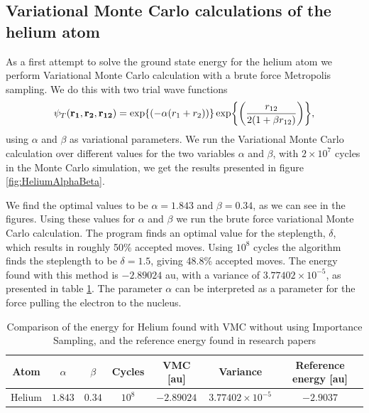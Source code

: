 
	\subsection{Variational Monte Carlo calculations of the helium atom}
		As a first attempt to solve the ground state energy for the helium
		atom we perform Variational Monte Carlo calculation with a brute force
		Metropolis sampling. We do this with two trial wave functions
		\[
		\psi_{T}({\bf r_{1}},{\bf r_{2}},{\bf r_{12}})=\exp{\left(-\alpha(r_{1}+r_{2})\right)}\exp{\left(\frac{r_{12}}{2(1+\beta r_{12})}\right)},
		\]
		using $\alpha$ and $\beta$ as variational parameters. 
		We run the Variational Monte Carlo calculation over
		different values for the two variables $\alpha$ and $\beta$, 
		with $2\times10^{7}$ cycles in the Monte Carlo simulation, we get the results
		presented in figure \ref{fig:HeliumAlphaBeta}.
		
		We find the optimal values to be  $\alpha=1.843$ and $\beta=0.34$, as we can see in the figures.
		Using these values for $\alpha$ and $\beta$ we run the brute force variational Monte Carlo calculation. The program finds an optimal value for the steplength, $\delta$, which results in roughly 50\% accepted moves. Using $10^{8}$ cycles the algorithm finds the steplength to be $\delta = 1.5$, giving 48.8\% accepted moves. The energy found with this method is $-2.89024$ au, with a variance of $3.77402\times10^{-5}$, as presented in table \ref{tab:Helium_no_IS}.
		The parameter $\alpha$ can be interpreted as a parameter for the
		force pulling the electron to the nucleus.

		\begin{table}
			\center
			\begin{tabular}{|c|c|c|c|c|c|c|}
			    \hline
			   	Atom  & $\alpha$ & $\beta$ & Cycles & VMC {[}au{]} & Variance & Reference energy {[}au{]} \tabularnewline
				\hline 
				Helium & $1.843$ & $0.34$ & $10^{8}$ & $-2.89024$ & $3.77402\times10^{-5}$ & $-2.9037$\tabularnewline
				\hline 
			\end{tabular}
			\caption{Comparison of the energy for Helium found with VMC without using Importance Sampling, and the reference energy found in research papers \parencite{Binkley_1975}}
			\label{tab:Helium_no_IS}
		\end{table}
		


